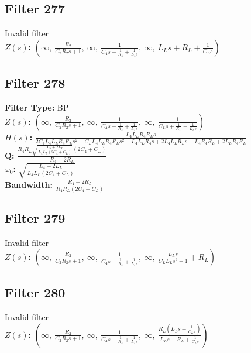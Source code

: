 \documentclass{article}
\begin{document}
\subsection*{Filter 277}
Invalid filter \\ 
\textbf{$Z(s)$:} $\left( \infty, \  \frac{R_{2}}{C_{2} R_{2} s + 1}, \  \infty, \  \frac{1}{C_{4} s + \frac{1}{R_{4}} + \frac{1}{L_{4} s}}, \  \infty, \  L_{L} s + R_{L} + \frac{1}{C_{L} s}\right)$ \\ 
\subsection*{Filter 278}
\textbf{Filter Type:} BP \\ 
\textbf{$Z(s)$:} $\left( \infty, \  \frac{R_{2}}{C_{2} R_{2} s + 1}, \  \infty, \  \frac{1}{C_{4} s + \frac{1}{R_{4}} + \frac{1}{L_{4} s}}, \  \infty, \  \frac{1}{C_{L} s + \frac{1}{R_{L}} + \frac{1}{L_{L} s}}\right)$ \\ 
\textbf{$H(s)$:} $\frac{L_{4} L_{L} R_{4} R_{L} s}{2 C_{4} L_{4} L_{L} R_{4} R_{L} s^{2} + C_{L} L_{4} L_{L} R_{4} R_{L} s^{2} + L_{4} L_{L} R_{4} s + 2 L_{4} L_{L} R_{L} s + L_{4} R_{4} R_{L} + 2 L_{L} R_{4} R_{L}}$ \\ 
\textbf{Q:} $\frac{R_{4} R_{L} \sqrt{\frac{L_{4} + 2 L_{L}}{L_{4} L_{L} \left(2 C_{4} + C_{L}\right)}} \left(2 C_{4} + C_{L}\right)}{R_{4} + 2 R_{L}}$ \\ 
\textbf{$\omega_0$:} $\sqrt{\frac{L_{4} + 2 L_{L}}{L_{4} L_{L} \left(2 C_{4} + C_{L}\right)}}$ \\ 
\textbf{Bandwidth:} $\frac{R_{4} + 2 R_{L}}{R_{4} R_{L} \left(2 C_{4} + C_{L}\right)}$ \\ 
\subsection*{Filter 279}
Invalid filter \\ 
\textbf{$Z(s)$:} $\left( \infty, \  \frac{R_{2}}{C_{2} R_{2} s + 1}, \  \infty, \  \frac{1}{C_{4} s + \frac{1}{R_{4}} + \frac{1}{L_{4} s}}, \  \infty, \  \frac{L_{L} s}{C_{L} L_{L} s^{2} + 1} + R_{L}\right)$ \\ 
\subsection*{Filter 280}
Invalid filter \\ 
\textbf{$Z(s)$:} $\left( \infty, \  \frac{R_{2}}{C_{2} R_{2} s + 1}, \  \infty, \  \frac{1}{C_{4} s + \frac{1}{R_{4}} + \frac{1}{L_{4} s}}, \  \infty, \  \frac{R_{L} \left(L_{L} s + \frac{1}{C_{L} s}\right)}{L_{L} s + R_{L} + \frac{1}{C_{L} s}}\right)$ \\ 
\end{document}
